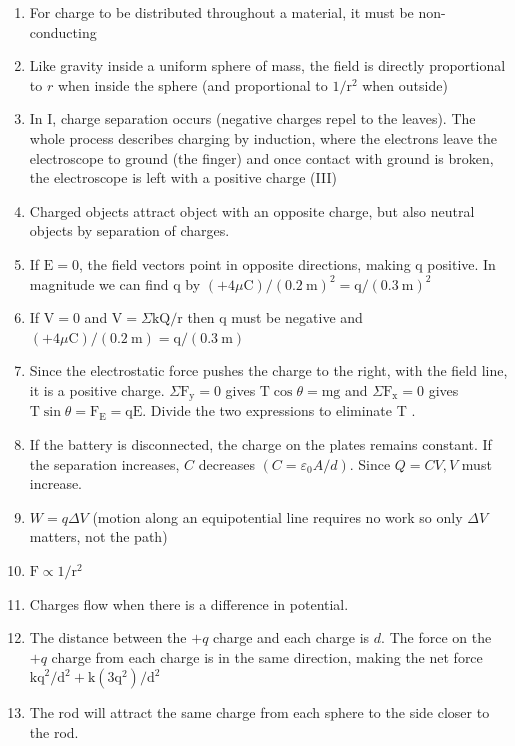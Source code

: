 \begin{enumerate}
\begin{enumerate}
  \item For charge to be distributed throughout a material, it must be non-conducting
  \item Like gravity inside a uniform sphere of mass, the field is directly proportional to $r$ when inside the sphere (and proportional to $1 / \mathrm{r}^{2}$ when outside)
  \item In I, charge separation occurs (negative charges repel to the leaves). The whole process describes charging by induction, where the electrons leave the electroscope to ground (the finger) and once contact with ground is broken, the electroscope is left with a positive charge (III)
  \item Charged objects attract object with an opposite charge, but also neutral objects by separation of charges.
  \item If $\mathrm{E}=0$, the field vectors point in opposite directions, making q positive. In magnitude we can find q by $(+4 \mu \mathrm{C}) /(0.2 \mathrm{~m})^{2}=\mathrm{q} /(0.3 \mathrm{~m})^{2}$
  \item If $\mathrm{V}=0$ and $\mathrm{V}=\Sigma \mathrm{kQ} / \mathrm{r}$ then q must be negative and $(+4 \mu \mathrm{C}) /(0.2 \mathrm{~m})=\mathrm{q} /(0.3 \mathrm{~m})$
  \item Since the electrostatic force pushes the charge to the right, with the field line, it is a positive charge. $\Sigma \mathrm{F}_{\mathrm{y}}=0$ gives $\mathrm{T} \cos \theta=\mathrm{mg}$ and $\Sigma \mathrm{F}_{\mathrm{x}}=0$ gives $\mathrm{T} \sin \theta=\mathrm{F}_{\mathrm{E}}=\mathrm{qE}$. Divide the two expressions to eliminate T .
  \item If the battery is disconnected, the charge on the plates remains constant. If the separation increases, $C$ decreases $\left(C=\varepsilon_{0} A / d\right)$. Since $Q=C V, V$ must increase.
  \item $W=q \Delta V$ (motion along an equipotential line requires no work so only $\Delta V$ matters, not the path)
  \item $\mathrm{F} \propto 1 / \mathrm{r}^{2}$
  \item Charges flow when there is a difference in potential.
  \item The distance between the $+q$ charge and each charge is $d$. The force on the $+q$ charge from each charge is in the same direction, making the net force $\mathrm{kq}^{2} / \mathrm{d}^{2}+\mathrm{k}\left(3 \mathrm{q}^{2}\right) / \mathrm{d}^{2}$
  \item The rod will attract the same charge from each sphere to the side closer to the rod.

\end{enumerate}
\end{enumerate}
